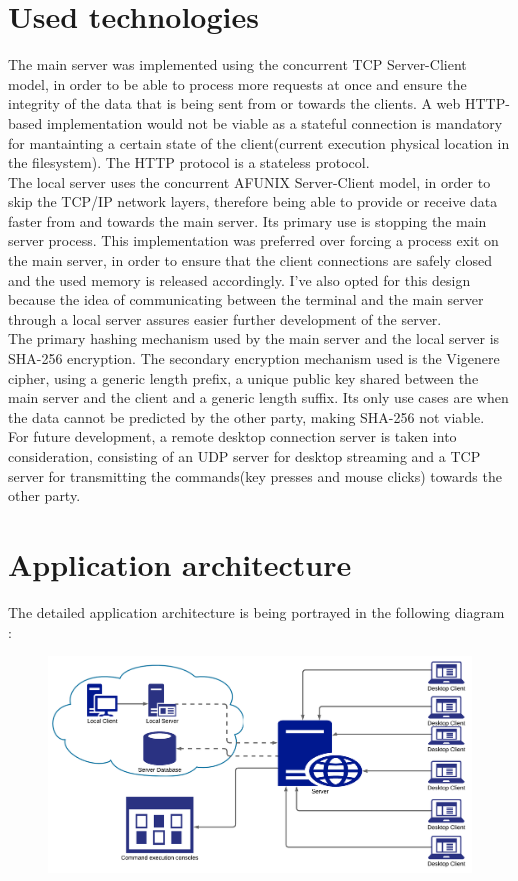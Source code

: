 \documentclass[runningheads]{llncs}
\begin{document}
\section{Used technologies}
The main server was implemented using the concurrent TCP Server-Client model, in order to be able to process more requests at once and ensure the integrity of the data that is being sent from or towards the clients. A web HTTP-based implementation would not be viable as a stateful connection is mandatory for mantainting a certain state of the client(current execution physical location in the filesystem). The HTTP protocol is a stateless protocol.\\
The local server uses the concurrent AF\textunderscore UNIX Server-Client model, in order to skip the TCP/IP network layers, therefore being able to provide or receive data faster from and towards the main server. Its primary use is stopping the main server process. This implementation was preferred over forcing a process exit on the main server, in order to ensure that the client connections are safely closed and the used memory is released accordingly. I've also opted for this design because the idea of communicating between the terminal and the main server through a local server assures easier further development of the server.\\
The primary hashing mechanism used by the main server and the local server is SHA-256 encryption. The secondary encryption mechanism used is the Vigenere cipher, using a generic length prefix, a unique public key shared between the main server and the client and a generic length suffix. Its only use cases are when the data cannot be predicted by the other party, making SHA-256 not viable.\\
For future development, a remote desktop connection server is taken into consideration, consisting of an UDP server for desktop streaming and a TCP server for transmitting the commands(key presses and mouse clicks) towards the other party.

\section{Application architecture}

The detailed application architecture is being portrayed in the following diagram :\\

\begin{figure}[H]
\centering
\includegraphics[width=150mm]{Network Diagram.png}
\end{figure}
\end{document}
